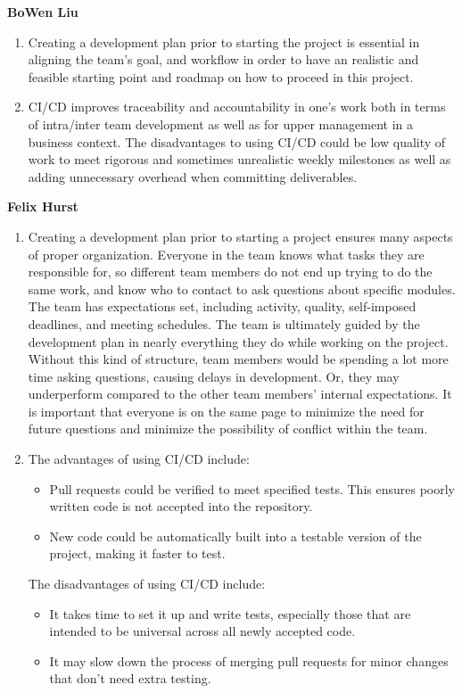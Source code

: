 \textbf{BoWen Liu}
\begin{enumerate}
\item{Creating a development plan prior to starting the project is essential in aligning the team’s goal, and workflow in order to have an realistic and feasible starting point and roadmap on how to proceed in this project.}
\item{CI/CD improves traceability and accountability in one’s work both in terms of intra/inter team development as well as for upper management in a business context. The disadvantages to using CI/CD could be low quality of work to meet rigorous and sometimes unrealistic weekly milestones as well as adding unnecessary overhead when committing deliverables.}
\end{enumerate}

\textbf{Felix Hurst}
\begin{enumerate}
\item{Creating a development plan prior to starting a project ensures many aspects of proper organization. Everyone in the team knows what tasks they are responsible for, so different team members do not end up trying to do the same work, and know who to contact to ask questions about specific modules. The team has expectations set, including activity, quality, self-imposed deadlines, and meeting schedules. The team is ultimately guided by the development plan in nearly everything they do while working on the project. Without this kind of structure, team members would be spending a lot more time asking questions, causing delays in development. Or, they may underperform compared to the other team members’ internal expectations. It is important that everyone is on the same page to minimize the need for future questions and minimize the possibility of conflict within the team.}
\item{The advantages of using CI/CD include:
\begin{itemize}
\item{Pull requests could be verified to meet specified tests. This ensures poorly written code is not accepted into the repository.}
\item{New code could be automatically built into a testable version of the project, making it faster to test.}
\end{itemize}

The disadvantages of using CI/CD include:
\begin{itemize}
\item{It takes time to set it up and write tests, especially those that are intended to be universal across all newly accepted code.}
\item{It may slow down the process of merging pull requests for minor changes that don’t need extra testing.}
\end{itemize}
}
\end{enumerate}

